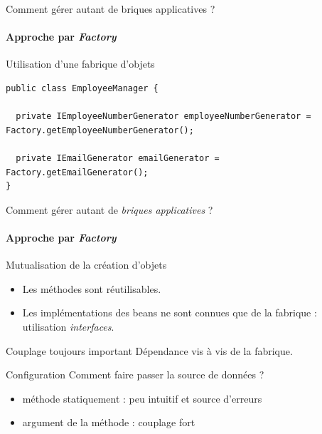 \documentclass[compress]{beamer}%
\begin{document}
\begin{frame}[containsverbatim]{Comment gérer autant de briques applicatives ?}
	\framesubtitle{Approche par \emph{Factory}}
	
	Utilisation d'une fabrique d'objets
	\begin{lstlisting}
public class EmployeeManager {
	
  private IEmployeeNumberGenerator employeeNumberGenerator = Factory.getEmployeeNumberGenerator();		
  
  private IEmailGenerator emailGenerator = Factory.getEmailGenerator();
}
	\end{lstlisting}
	
	
\end{frame}

\begin{frame}{Comment gérer autant de \emph{briques applicatives} ?}
	\framesubtitle{Approche par \emph{Factory}}

	\begin{exampleblock}{Mutualisation de la création d'objets}
	\begin{itemize}[<+->]
	\item Les méthodes sont réutilisables.
	\item Les implémentations des beans ne sont connues que de la fabrique : utilisation \emph{interfaces}.
	\end{itemize}
	\end{exampleblock}
	
	\pause
	\begin{alertblock}{Couplage toujours important}
	Dépendance vis à vis de la fabrique.
	\end{alertblock}
	
	\pause
	\begin{alertblock}{Configuration}
	Comment faire passer la source de données ? 	
	\begin{itemize}[<+->]
	\item méthode statiquement : peu intuitif et source d'erreurs
	\item argument de la méthode : couplage fort
	\end{itemize}
	\end{alertblock}
\end{frame}
\end{document}
